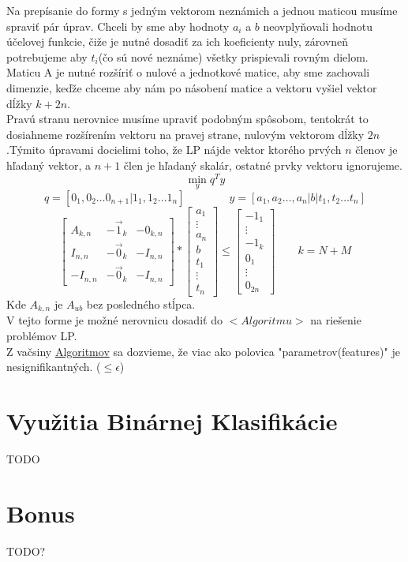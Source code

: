 \documentclass{article}
\begin{document}
Na prepísanie do formy s jedným vektorom neznámich a jednou maticou musíme spraviť pár úprav. Chceli by sme aby hodnoty $a_i$ a $b$ neovplyňovali hodnotu účelovej funkcie, čiže je nutné dosadiť za ich koeficienty nuly, zárovneň potrebujeme aby $t_i$(čo sú nové neznáme) všetky prispievali rovným dielom.\\
Maticu A je nutné rozšíriť o nulové a jednotkové matice, aby sme zachovali dimenzie, keďže chceme aby nám po násobení matice a vektoru vyšiel vektor dĺžky $k + 2n$. \\Pravú stranu nerovnice musíme upraviť podobným spôsobom, tentokrát to dosiahneme rozšírením vektoru na pravej strane, nulovým vektorom dĺžky $2n$.Týmito úpravami docielimi toho, že LP nájde vektor ktorého prvých $n$ členov je hľadaný vektor, a $n+1$ člen je hľadaný skalár, ostatné prvky vektoru ignorujeme.
\\
\[\min_y q^T y \]
\[q = [0_1,0_2 \ldots 0_{n+1}|1_1, 1_2 \ldots 1_{n}] \qquad 
\qquad y = [a_1,a_2\ldots,a_{n}|b|t_1, t_2 \ldots t_{n}]\]
\[
\begin{bmatrix}
A_{k,n} & -\Vec{1}_k & -0_{k,n}\\ 
I_{n,n} & -\Vec{0}_k & -I_{n,n} \\ 
-I_{n,n} & -\Vec{0}_k & -I_{n,n}
\end{bmatrix}
*
\begin{bmatrix}
a_1\\ \vdots \\a_n \\ \hline  b \\ \hline t_1\\\vdots \\t_n
\end{bmatrix}
\leq
\begin{bmatrix}
-1_1\\ \vdots \\-1_k \\ \hline 0_1 \\\vdots \\ 0_{2n} 
\end{bmatrix}
\qquad k = N + M\]
Kde $A_{k,n}$ je $A_{ub}$ bez posledného stĺpca.\\
V tejto forme je možné nerovnicu dosadiť do $<Algoritmu>$ na riešenie problémov LP.
\\

Z vačsiny \href{https://github.com/adam-213/LinPro2021/blob/main/Results/L1_norm.txt}{Algoritmov} sa dozvieme, že viac ako polovica "parametrov(features)" je nesignifikantných. ($\leq \epsilon$)
\section{Využitia Binárnej Klasifikácie}
TODO
\section{Bonus}
TODO?
\end{document}
